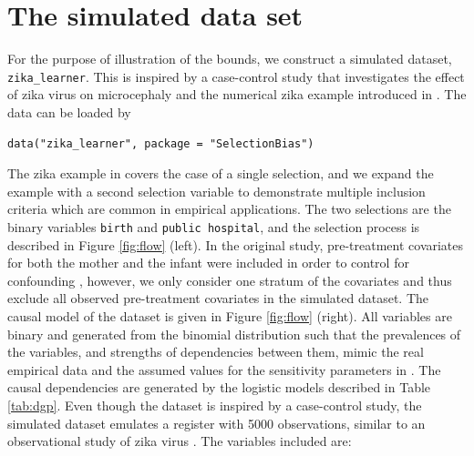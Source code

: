 \section{The simulated data set}\label{the-simulated-data-set}

For the purpose of illustration of the bounds, we construct a simulated dataset,
\texttt{zika\_learner}. This is inspired by a case-control study that investigates the
effect of zika virus on microcephaly \citep{de2018association} and the numerical zika
example introduced in \citet{smith2019bounding}. The data can be loaded by

\begin{verbatim}
data("zika_learner", package = "SelectionBias")
\end{verbatim}

The zika example in \citet{smith2019bounding} covers the case of a single selection,
and we expand the example with a second selection variable to demonstrate
multiple inclusion criteria which are common in empirical applications. The two
selections are the binary variables \texttt{birth} and \texttt{public\ hospital}, and the
selection process is described in Figure \ref{fig:flow} (left). In the original
study, pre-treatment covariates for both the mother and the infant were included
in order to control for confounding \citep{de2018association}, however, we only
consider one stratum of the covariates and thus exclude all observed pre-treatment
covariates in the simulated dataset. The causal model of the dataset is given in
Figure \ref{fig:flow} (right). All variables are binary and generated from the
binomial distribution such that the prevalences of the variables, and strengths
of dependencies between them, mimic the real empirical data and the assumed
values for the sensitivity parameters in \citet{smith2019bounding}. The causal
dependencies are generated by the logistic models described in Table
\ref{tab:dgp}. Even though the dataset is inspired by a case-control study, the
simulated dataset emulates a register with 5000 observations, similar to an
observational study of zika virus \citep{lebov2019international}. The variables
included are:

